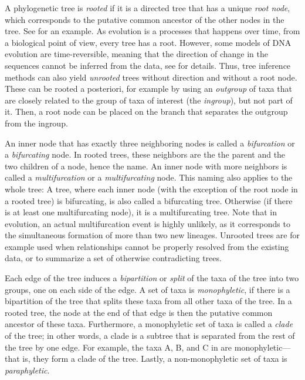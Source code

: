 A phylogenetic tree is \emph{rooted}
if it is a directed tree that has a unique \emph{root node},
which corresponds to the putative common ancestor of the other nodes in the tree.
See  for an example.
As evolution is a processes that happens over time,
from a biological point of view, every tree has a root.
However, some models of DNA evolution are time-reversible,
meaning that the direction of change in the sequences cannot be inferred from the data,
see  for details.
Thus, tree inference methods can also yield \emph{unrooted} trees without direction and without a root node.
These can be rooted a posteriori, for example by using an \emph{outgroup} of taxa
that are closely related to the group of taxa of interest (the \emph{ingroup}), but not part of it.
Then, a root node can be placed on the branch that separates the outgroup from the ingroup.

An inner node that has exactly three neighboring nodes is called a \emph{bifurcation} or a \emph{bifurcating} node.
In rooted trees, these neighbors are the the parent and the two children of a node, hence the name.
An inner node with more neighbors is called a \emph{multifurcation} or a \emph{multifurcating} node.
This naming also applies to the whole tree:
A tree, where each inner node (with the exception of the root node in a rooted tree) is bifurcating,
is also called a bifurcating tree.
Otherwise (if there is at least one multifurcating node), it is a multifurcating tree.
Note that in evolution, an actual multifurcation event is highly unlikely,
as it corresponds to the simultaneous formation of more than two new lineages.
Unrooted trees are for example used when relationships cannot be properly resolved from the existing data,
or to summarize a set of otherwise contradicting trees.

Each edge of the tree induces a \emph{bipartition} or \emph{split} of the taxa of the tree into two groups,
one on each side of the edge.
A set of taxa is \emph{monophyletic},
if there is a bipartition of the tree that splits these taxa from all other taxa of the tree.
In a rooted tree, the node at the end of that edge is then the putative common ancestor of these taxa.
Furthermore, a monophyletic set of taxa is called a \emph{clade} of the tree;
in other words, a clade is a subtree that is separated from the rest of the tree by one edge.
For example, the taxa {\sffamily A}, {\sffamily B}, and {\sffamily C} in  are monophyletic---%
that is, they form a clade of the tree.
Lastly, a non-monophyletic set of taxa is \emph{paraphyletic}.

